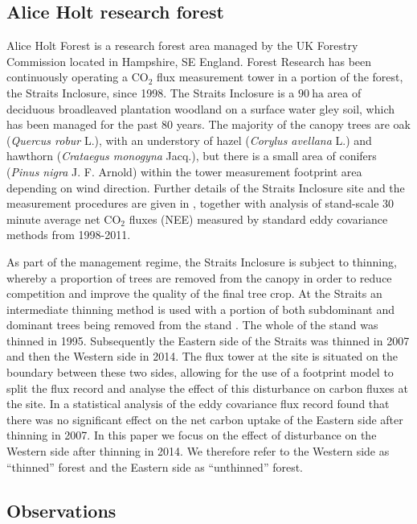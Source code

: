 \documentclass[draft,linenumbers]{agujournal}
\begin{document}
\subsection{Alice Holt research forest} \label{sec:site_description}

Alice Holt Forest is a research forest area managed by the UK Forestry Commission located in Hampshire, SE England. Forest Research has been continuously operating a $\text{CO}_{2}$ flux measurement tower in a portion of the forest, the Straits Inclosure, since 1998. The Straits Inclosure is a $90~\text{ha}$ area of deciduous broadleaved plantation woodland on a surface water gley soil, which has been managed for the past 80 years. The majority of the canopy trees are oak (\textit{Quercus robur} L.), with an understory of hazel (\textit{Corylus avellana} L.) and hawthorn (\textit{Crataegus monogyna} Jacq.), but there is a small area of conifers (\textit{Pinus nigra} J. F. Arnold) within the tower measurement footprint area depending on wind direction. Further details of the Straits Inclosure site and the measurement procedures are given in \citet{wilkinson2012inter}, together with analysis of stand-scale $30$ minute average net $\text{CO}_{2}$ fluxes (NEE) measured by standard eddy covariance methods from 1998-2011. 

As part of the management regime, the Straits Inclosure is subject to thinning, whereby a proportion of trees are removed from the canopy in order to reduce competition and improve the quality of the final tree crop. At the Straits an intermediate thinning method is used with a portion of both subdominant and dominant trees being removed from the stand \citep{kerr2011thinning}. The whole of the stand was thinned in 1995. Subsequently the Eastern side of the Straits was thinned in 2007 and then the Western side in 2014. The flux tower at the site is situated on the boundary between these two sides, allowing for the use of a footprint model to split the flux record and analyse the effect of this disturbance on carbon fluxes at the site. In \citet{wilkinson2015effects} a statistical analysis of the eddy covariance flux record found that there was no significant effect on the net carbon uptake of the Eastern side after thinning in 2007. In this paper we focus on the effect of disturbance on the Western side after thinning in 2014. We therefore refer to the Western side as ``thinned'' forest and the Eastern side as ``unthinned'' forest.   

\subsection{Observations} \label{sec:obs}
\end{document}
